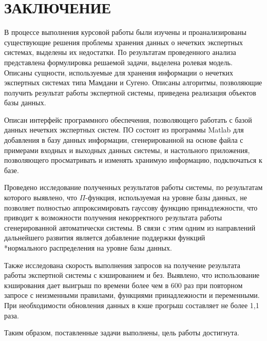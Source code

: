 \section*{ЗАКЛЮЧЕНИЕ}
В процессе выполнения курсовой работы были изучены и проанализированы существующие решения проблемы хранения данных о нечетких экспертных системах, выделены их недостатки. По результатам проведенного анализа представлена формулировка решаемой задачи, выделена ролевая модель. Описаны сущности, используемые для хранения информации о нечетких экспертных системах типа Мамдани и Сугено. Описаны алгоритмы, позволяющие получить результат работы экспертной системы, приведена реализация объектов базы данных.

Описан интерфейс программного обеспечения, позволяющего работать с базой данных нечетких экспертных систем. ПО состоит из программы Matlab для добавления в базу данных информации, сгенерированной на основе файла с примерами входных и выходных данных системы, и настольного приложения, позволяющего просматривать и изменять хранимую информацию, подключаться к базе.

Проведено исследование полученных результатов работы системы, по результатам которого выявлено, что $\Pi$-функция, используемая на уровне базы данных, не позволяет полностью аппроксимировать гауссову функцию принадлежности, что приводит к возможности получения некорректного результата работы сгенерированной автоматически системы. В связи с этим одним из направлений дальнейшего развития является добавление поддержки функций \\*нормального распределения на уровне базы данных.

Также исследована скорость выполнения запросов на получение результата работы экспертной системы с кэшированием и без. Выявлено, что использование кэширования дает выигрыш по времени более чем в 600 раз при повторном запросе с неизменными правилами, функциями принадлежности и переменными. При необходимости обновления данных в кэше прогрыш составляет не более 1,1 раза.

Таким образом, поставленные задачи выполнены, цель работы достигнута.
\pagebreak